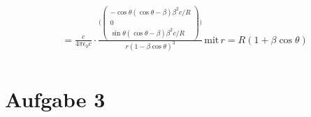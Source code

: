 \documentclass[11pt,a4paper]{article}
\begin{document}
\begin{itemize}
\begin{align*}
							&= \frac{e}{4 \pi \epsilon_{0} c} \cdot \frac{ \Biggl( \begin{pmatrix} -\cos{\theta} (\cos{\theta - \beta}) \beta^2c/R \\ 0 \\ \sin{\theta}(\cos{\theta} - \beta) \beta^2c/R \end{pmatrix} \Biggr) }{r (1 - \beta \cos{\theta})^3} \, \text{mit} \, r = R(1+\beta \cos{\theta}) \\
			\end{align*}
	\end{itemize}
    \section*{Aufgabe 3}
\end{document}
